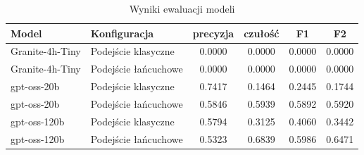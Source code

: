 \begin{table}[htbp]
\centering
\caption{Wyniki ewaluacji modeli}
\label{tab:wyniki}
\begin{tabular}{llcccc}
\toprule
Model & Konfiguracja & precyzja & czułość & F1 & F2 \\
\midrule
Granite-4h-Tiny & Podejście klasyczne & 0.0000 & 0.0000 & 0.0000 & 0.0000 \\
Granite-4h-Tiny & Podejście łańcuchowe & 0.0000 & 0.0000 & 0.0000 & 0.0000 \\
gpt-oss-20b & Podejście klasyczne & 0.7417 & 0.1464 & 0.2445 & 0.1744 \\
gpt-oss-20b & Podejście łańcuchowe & 0.5846 & 0.5939 & 0.5892 & 0.5920 \\
gpt-oss-120b & Podejście klasyczne & 0.5794 & 0.3125 & 0.4060 & 0.3442 \\
gpt-oss-120b & Podejście łańcuchowe & 0.5323 & 0.6839 & 0.5986 & 0.6471 \\
\bottomrule
\end{tabular}
\end{table}
